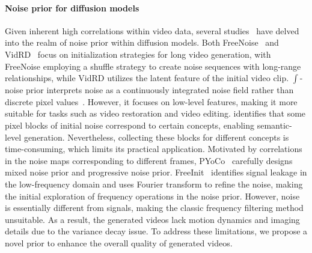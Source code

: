 \paragraph{Noise prior for diffusion models}
Given inherent high correlations within video data, several studies~\citep{ge2023PYoCo,qiu2023freenoise,chang2024warp,gu2023reuse,mao2024lottery,wu2023freeinit} have delved into the realm of noise prior within diffusion models.
Both FreeNoise~\citep{qiu2023freenoise} and VidRD~\citep{gu2023reuse} focus on initialization strategies for long video generation, with FreeNoise employing a shuffle strategy to create noise sequences with long-range relationships, while VidRD utilizes the latent feature of the initial video clip.
$\int$-noise prior interprets noise as a continuously integrated noise field rather than discrete pixel values~\citep{chang2024warp}. However, it focuses on low-level features, making it more suitable for tasks such as video restoration and video editing. 
\citet{mao2024lottery} identifies that some pixel blocks of initial noise correspond to certain concepts, enabling semantic-level generation. Nevertheless, collecting these blocks for different concepts is time-consuming, which limits its practical application.
Motivated by correlations in the noise maps corresponding to different frames, PYoCo~\citep{ge2023PYoCo} carefully designs mixed noise prior and progressive noise prior. 
FreeInit~\citep{wu2023freeinit} identifies signal leakage in the low-frequency domain and uses Fourier transform to refine the noise, making the initial exploration of frequency operations in the noise prior.
However, noise is essentially different from signals, making the classic frequency filtering method unsuitable. As a result, 
the generated videos lack motion dynamics and imaging details due to the variance decay issue.
To address these limitations, we propose a novel prior to enhance the overall quality of generated videos.
